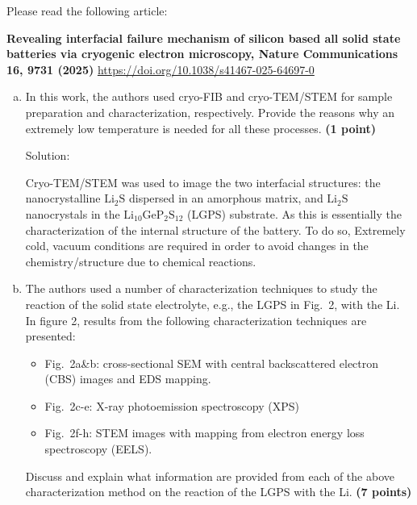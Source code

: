 \begin{homeworkProblem}
    Please read the following article:

    
    \noindent\textbf{Revealing interfacial failure mechanism of silicon based all solid state batteries via cryogenic electron microscopy, Nature Communications 16, 9731 (2025)} \url{https://doi.org/10.1038/s41467-025-64697-0}

    

    \begin{enumerate}[a)]

        \item In this work, the authors used cryo-FIB and cryo-TEM/STEM for sample preparation and characterization, respectively. Provide the reasons why an extremely low temperature is needed for all these processes. \textbf{(1 point)}

            \begin{callout}{Solution:}

                Cryo-TEM/STEM was used to image the two interfacial structures: the nanocrystalline $\mathrm{Li_2S}$ dispersed in an amorphous matrix, and $\mathrm{Li_2S}$ nanocrystals in the $\mathrm{Li_{10}GeP_{2}S_{12}}$ (LGPS) substrate. As this is essentially the characterization of the internal structure of the battery. To do so, Extremely cold, vacuum conditions are required in order to avoid changes in the chemistry/structure due to chemical reactions.

            \end{callout}

        \item The authors used a number of characterization techniques to study the reaction of the solid state electrolyte, e.g., the LGPS in Fig.\ 2, with the Li. In figure 2, results from the following characterization techniques are presented:

            \begin{itemize}
                \item Fig.\ 2a\&b: cross-sectional SEM with central backscattered electron (CBS) images and EDS mapping.
                \item Fig.\ 2c-e: X-ray photoemission spectroscopy (XPS)
                \item Fig.\ 2f-h: STEM images with mapping from electron energy loss spectroscopy (EELS).
            \end{itemize}

            Discuss and explain what information are provided from each of the above characterization method on the reaction of the LGPS with the Li. \textbf{(7 points)}


\end{enumerate}
\end{homeworkProblem}
